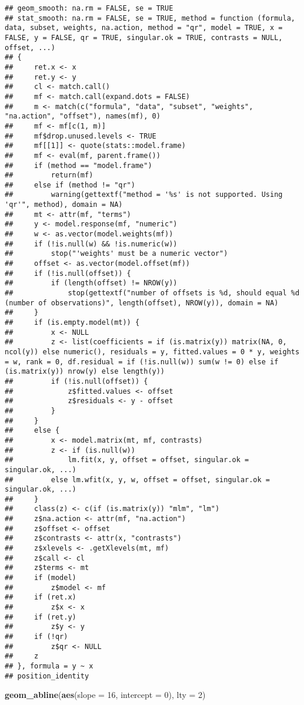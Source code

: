 \documentclass[]{article}
\newenvironment{Shaded}{\begin{snugshade}}{\end{snugshade}}
\newcommand{\KeywordTok}[1]{\textcolor[rgb]{0.13,0.29,0.53}{\textbf{#1}}}
\newcommand{\DataTypeTok}[1]{\textcolor[rgb]{0.13,0.29,0.53}{#1}}
\newcommand{\DecValTok}[1]{\textcolor[rgb]{0.00,0.00,0.81}{#1}}
\newcommand{\NormalTok}[1]{#1}
\begin{document}
\begin{verbatim}
## geom_smooth: na.rm = FALSE, se = TRUE
## stat_smooth: na.rm = FALSE, se = TRUE, method = function (formula, data, subset, weights, na.action, method = "qr", model = TRUE, x = FALSE, y = FALSE, qr = TRUE, singular.ok = TRUE, contrasts = NULL, offset, ...) 
## {
##     ret.x <- x
##     ret.y <- y
##     cl <- match.call()
##     mf <- match.call(expand.dots = FALSE)
##     m <- match(c("formula", "data", "subset", "weights", "na.action", "offset"), names(mf), 0)
##     mf <- mf[c(1, m)]
##     mf$drop.unused.levels <- TRUE
##     mf[[1]] <- quote(stats::model.frame)
##     mf <- eval(mf, parent.frame())
##     if (method == "model.frame") 
##         return(mf)
##     else if (method != "qr") 
##         warning(gettextf("method = '%s' is not supported. Using 'qr'", method), domain = NA)
##     mt <- attr(mf, "terms")
##     y <- model.response(mf, "numeric")
##     w <- as.vector(model.weights(mf))
##     if (!is.null(w) && !is.numeric(w)) 
##         stop("'weights' must be a numeric vector")
##     offset <- as.vector(model.offset(mf))
##     if (!is.null(offset)) {
##         if (length(offset) != NROW(y)) 
##             stop(gettextf("number of offsets is %d, should equal %d (number of observations)", length(offset), NROW(y)), domain = NA)
##     }
##     if (is.empty.model(mt)) {
##         x <- NULL
##         z <- list(coefficients = if (is.matrix(y)) matrix(NA, 0, ncol(y)) else numeric(), residuals = y, fitted.values = 0 * y, weights = w, rank = 0, df.residual = if (!is.null(w)) sum(w != 0) else if (is.matrix(y)) nrow(y) else length(y))
##         if (!is.null(offset)) {
##             z$fitted.values <- offset
##             z$residuals <- y - offset
##         }
##     }
##     else {
##         x <- model.matrix(mt, mf, contrasts)
##         z <- if (is.null(w)) 
##             lm.fit(x, y, offset = offset, singular.ok = singular.ok, ...)
##         else lm.wfit(x, y, w, offset = offset, singular.ok = singular.ok, ...)
##     }
##     class(z) <- c(if (is.matrix(y)) "mlm", "lm")
##     z$na.action <- attr(mf, "na.action")
##     z$offset <- offset
##     z$contrasts <- attr(x, "contrasts")
##     z$xlevels <- .getXlevels(mt, mf)
##     z$call <- cl
##     z$terms <- mt
##     if (model) 
##         z$model <- mf
##     if (ret.x) 
##         z$x <- x
##     if (ret.y) 
##         z$y <- y
##     if (!qr) 
##         z$qr <- NULL
##     z
## }, formula = y ~ x
## position_identity
\end{verbatim}

\begin{Shaded}
\begin{Highlighting}[]
  \KeywordTok{geom_abline}\NormalTok{(}\KeywordTok{aes}\NormalTok{(}\DataTypeTok{slope =} \DecValTok{16}\NormalTok{, }\DataTypeTok{intercept =} \DecValTok{0}\NormalTok{), }\DataTypeTok{lty =} \DecValTok{2}\NormalTok{) }
\end{Highlighting}
\end{Shaded}
\end{document}
